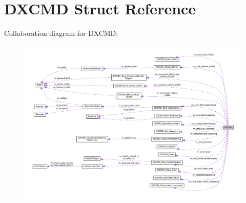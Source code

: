 \hypertarget{structDXCMD}{}\section{D\+X\+C\+MD Struct Reference}
\label{structDXCMD}


Collaboration diagram for D\+X\+C\+MD\+:
\nopagebreak
\begin{figure}[H]
\begin{center}
\leavevmode
\includegraphics[width=350pt]{structDXCMD__coll__graph}
\end{center}
\end{figure}
